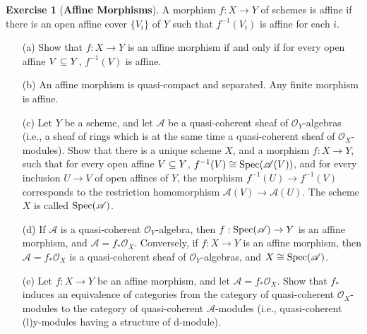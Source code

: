 \documentclass[11pt]{book}
\theoremstyle{definition}
\newtheorem{exercise}{Exercise}[section]
\begin{document}
\begin{exercise}[\textbf{Affine Morphisms}]
A morphism $f:X\to Y$ of schemes is affine if there is an open affine cover $\{V_i\}$ of $Y$ such that $f^{-1}(V_i)$ is affine for each $i$.
\begin{itemize}
\item[(a)] Show that $f:X\to Y$ is an affine morphism if and only if for every open affine $V\subseteq Y$, $f^{-1}(V)$ is affine.
\item[(b)] An affine morphism is quasi-compact and separated. Any finite morphism is affine.
\item[(c)] Let $Y$ be a scheme, and let $\mathscr{A}$ be a quasi-coherent sheaf of $\mathscr{O}_Y$-algebras (i.e., a sheaf of rings which is at the same time a quasi-coherent sheaf of $\mathscr{O}_X$-modules). Show that there is a unique scheme $X$, and a morphism $f:X\to Y$, such that for every open affine $V\subseteq Y$, $f^{-1}(V)\cong\mathrm{Spec}(\mathscr{A}(V))$, and for every inclusion $U\rightarrow V$ of open affines of $Y$, the morphism $f^{-1}(U)\rightarrow f^{-1}(V)$ corresponds to the restriction homomorphism $\mathscr{A}(V)\to\mathscr{A}(U)$. The scheme $X$ is called $\mathrm{Spec}(\mathscr{A})$.
\item[(d)] If $\mathscr{A}$ is a quasi-coherent $\mathscr{O}_Y$-algebra, then $f:\mathrm{Spec}(\mathscr{A})\to Y$ is an affine morphism, and $\mathscr{A}=f_*\mathscr{O}_X$. Conversely, if $f:X\to Y$ is an affine morphism, then $\mathscr{A}=f_*\mathscr{O}_X$ is a quasi-coherent sheaf of $\mathscr{O}_Y$-algebras, and $X\cong\mathrm{Spec}(\mathscr{A})$.
\item[(e)] Let $f:X\to Y$ be an affine morphism, and let $\mathscr{A}=f_*\mathscr{O}_X$. Show that $f_*$ induces an equivalence of categories from the category of quasi-coherent $\mathscr{O}_X$-modules to the category of quasi-coherent $\mathscr{A}$-modules (i.e., quasi-coherent (l)y-modules
having a structure of d-module).
\end{itemize}
\end{exercise}
\end{document}
